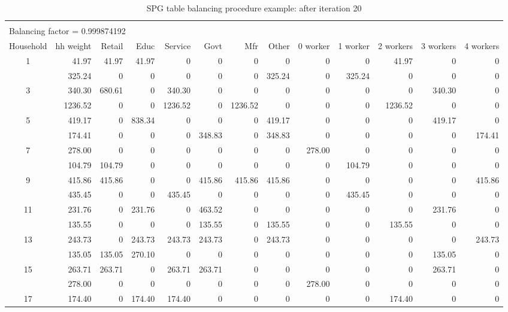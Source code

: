 \begin{sidewaystable}  %
\centering
\caption{SPG table balancing procedure example: after iteration 20}
\label{tab:spg-after-iteration20}
\small
\begin{tabular}{c*{12}{r}}
\vspace{-8pt} \\
\multicolumn{8}{l}{Balancing factor = 0.999874192} \\
\hline
Household & hh weight & Retail & Educ & Service & Govt & Mfr & Other & 0 worker & 1 worker & 2 workers & 3 workers & 4 workers \\
\hline
1 & 41.97 & 41.97 & 41.97 & 0 & 0 & 0 & 0 & 0 & 0 & 41.97 & 0 & 0 \\
\gray 2 & 325.24 & 0 & 0 & 0 & 0 & 0 & 325.24 & 0 & 325.24 & 0 & 0 & 0 \\
3 & 340.30 & 680.61 & 0 & 340.30 & 0 & 0 & 0 & 0 & 0 & 0 & 340.30 & 0 \\
\gray 4 & 1236.52 & 0 & 0 & 1236.52 & 0 & 1236.52 & 0 & 0 & 0 & 1236.52 & 0 & 0 \\
5 & 419.17 & 0 & 838.34 & 0 & 0 & 0 & 419.17 & 0 & 0 & 0 & 419.17 & 0 \\
\gray 6 & 174.41 & 0 & 0 & 0 & 348.83 & 0 & 348.83 & 0 & 0 & 0 & 0 & 174.41 \\
7 & 278.00 & 0 & 0 & 0 & 0 & 0 & 0 & 278.00 & 0 & 0 & 0 & 0 \\
\gray 8 & 104.79 & 104.79 & 0 & 0 & 0 & 0 & 0 & 0 & 104.79 & 0 & 0 & 0 \\
9 & 415.86 & 415.86 & 0 & 0 & 415.86 & 415.86 & 415.86 & 0 & 0 & 0 & 0 & 415.86 \\
\gray 10 & 435.45 & 0 & 0 & 435.45 & 0 & 0 & 0 & 0 & 435.45 & 0 & 0 & 0 \\
11 & 231.76 & 0 & 231.76 & 0 & 463.52 & 0 & 0 & 0 & 0 & 0 & 231.76 & 0 \\
\gray 12 & 135.55 & 0 & 0 & 0 & 135.55 & 0 & 135.55 & 0 & 0 & 135.55 & 0 & 0 \\
13 & 243.73 & 0 & 243.73 & 243.73 & 243.73 & 0 & 243.73 & 0 & 0 & 0 & 0 & 243.73 \\
\gray 14 & 135.05 & 135.05 & 270.10 & 0 & 0 & 0 & 0 & 0 & 0 & 0 & 135.05 & 0 \\
15 & 263.71 & 263.71 & 0 & 263.71 & 263.71 & 0 & 0 & 0 & 0 & 0 & 263.71 & 0 \\
\gray 16 & 278.00 & 0 & 0 & 0 & 0 & 0 & 0 & 278.00 & 0 & 0 & 0 & 0 \\
17 & 174.40 & 0 & 174.40 & 174.40 & 0 & 0 & 0 & 0 & 0 & 174.40 & 0 & 0 \\

\end{tabular}
\end{sidewaystable}
